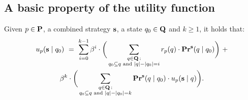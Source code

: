 


\subsection{A basic property of the utility function}

\begin{mylem}\label{lem-dist-k}
Given $p \in \mathbf{P}$, a combined strategy $\mathbf{s}$, a state $q_0 \in \mathbf{Q}$ and $k \geq 1$, it holds that:
\begin{multline*}
u_p(\mathbf{s} \mid q_0) \ = \  
\sum_{i=0}^{k-1} \beta^i \cdot \bigg(\sum_{\substack{q \in \mathbf{Q} \,: \\ q_0 \subseteq q \text{ {\rm and} } |q| - |q_0| = i}}
r_p(q) \cdot \mathbf{Pr}^{\mathbf{s}}(q \mid q_0)\bigg) \ + \\
\beta^k \cdot 
\bigg(\sum_{\substack{q \in \mathbf{Q} \,: \\ q_0 \subseteq q \text{ {\rm and} } |q| - |q_0| = k}}
\mathbf{Pr}^{\mathbf{s}}(q \mid q_0) \cdot u_p(\mathbf{s} \mid q)\bigg).
\end{multline*}
\end{mylem}

